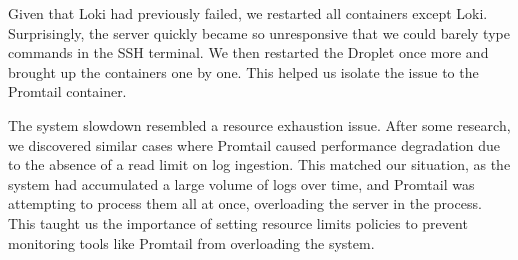 \documentclass[12pt,a4paper,reqno]{report}
\begin{document}
Given that Loki had previously failed, we restarted all containers except Loki. Surprisingly, the server quickly became so unresponsive that we could barely type commands in the SSH terminal. We then restarted the Droplet once more and brought up the containers one by one. This helped us isolate the issue to the Promtail container.

The system slowdown resembled a resource exhaustion issue. After some research, we discovered similar cases where Promtail caused performance degradation due to the absence of a read limit on log ingestion. This matched our situation, as the system had accumulated a large volume of logs over time, and Promtail was attempting to process them all at once, overloading the server in the process. This taught us the importance of setting resource limits policies to prevent monitoring tools like Promtail from overloading the system.



\printbibliography[heading=none]
\end{document}
